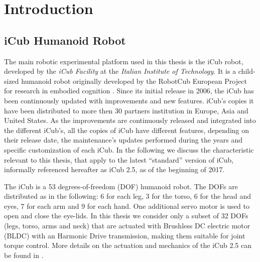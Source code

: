 \chapter{Introduction}  



\section{iCub Humanoid Robot}
\label{sec:icub}
The main robotic experimental platform used in this thesis is the iCub robot, developed by the \emph{iCub Facility} at the \emph{Italian Institute of Technology}. It is a child-sized humanoid robot originally developed by the RobotCub European Project for research in embodied cognition \citep{sandini2014}. 
Since its initial release in 2006, the iCub has been continuously updated with improvements and new features. iCub's copies it have been distributed to more then 30 partners institution in Europe, Asia and United States. As the improvements are continuously released and integrated into the different iCub's, all the copies of iCub have different features, depending on their release date, the maintenance's updates performed during the years and specific customization of each iCub. In the following we discuss the characteristic relevant to this thesis, that apply to the latest ``standard'' version of iCub, informally referenced hereafter as iCub 2.5, as of the beginning of 2017. 

The iCub is a 53 degrees-of-freedom (DOF) humanoid robot. The DOFs are distributed as in the following: 6 for each leg, 3 for the torso, 6 for the head and eyes, 7 for each arm and 9 for each hand. One additional servo motor is used to open and close the eye-lids. In this thesis we consider only a subset of 32 DOFs (legs, torso, arms and neck) that are actuated with Brushless DC electric motor (BLDC) with an Harmonic Drive transmission, making them suitable for joint torque control. 
More details on the actuation and mechanics of the iCub 2.5 can be found in \citep{parmiggiani2012}.

